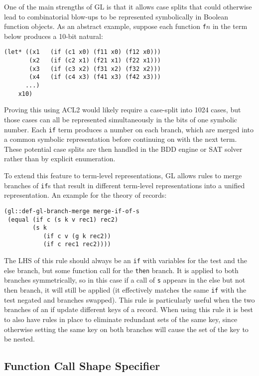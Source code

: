 \documentclass[submission,copyright,creativecommons]{eptcs}
\begin{document}
One of the main strengths of GL is that it allows case splits that
could otherwise lead to combinatorial blow-ups to be represented
symbolically in Boolean function objects.  As an abstract example,
suppose each function \texttt{f$n$} in the term below produces a
10-bit natural:
\begin{verbatim}
(let* ((x1   (if (c1 x0) (f11 x0) (f12 x0)))
       (x2   (if (c2 x1) (f21 x1) (f22 x1)))
       (x3   (if (c3 x2) (f31 x2) (f32 x2)))
       (x4   (if (c4 x3) (f41 x3) (f42 x3)))
      ...)
    x10)
\end{verbatim}
\noindent Proving this using ACL2 would likely require a case-split
into 1024 cases, but those cases can all be represented simultaneously
in the bits of one symbolic number.  Each \texttt{if}
term produces a number on each branch, which are merged into a common
symbolic representation before continuing on with the next term.
These potential case splits are then handled in the BDD engine or SAT
solver rather than by explicit enumeration.

To extend this feature to term-level representations, GL allows rules
to merge branches of \texttt{if}s that result in different term-level
representations into a unified representation. An
example for the theory of records:
\begin{verbatim}
(gl::def-gl-branch-merge merge-if-of-s
 (equal (if c (s k v rec1) rec2)
        (s k
           (if c v (g k rec2))
           (if c rec1 rec2))))  
\end{verbatim}
\noindent The LHS of this rule should always be an \texttt{if} with
variables for the test and the else branch, but some function call for
the \texttt{then} branch.  It is applied to both branches
symmetrically, so in this case if a call of \texttt{s} appears in the
else but not then branch, it will still be applied (it effectively
matches the same \texttt{if} with the test negated and branches
swapped).
This rule is particularly useful when the two branches of an if update
different keys of a record.  When using this rule it is best to also
have rules in place to eliminate redundant sets of the same key, since
otherwise setting the same key on both branches will cause the set of
the key to be nested.

\subsection{Function Call Shape Specifier}
\label{sec:callshapespec}
\end{document}
